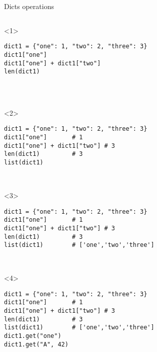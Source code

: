 \begin{frame}[fragile]{Dicts operations}

  \begin{columns}[onlytextwidth]
    \begin{column}{\textwidth}

      \begin{onlyenv}<1>
        \begin{lstlisting}[style=python,morekeywords={for, in, range, list}]
dict1 = {"one": 1, "two": 2, "three": 3}
dict1["one"]
dict1["one"] + dict1["two"]
len(dict1)




 \end{lstlisting}
      \end{onlyenv}

      \begin{onlyenv}<2>
        \begin{lstlisting}[style=python,morekeywords={for, in, range, list}]
dict1 = {"one": 1, "two": 2, "three": 3}
dict1["one"]       # 1
dict1["one"] + dict1["two"] # 3
len(dict1)         # 3
list(dict1)



 \end{lstlisting}
      \end{onlyenv}

      \begin{onlyenv}<3>
        \begin{lstlisting}[style=python,morekeywords={for, in, range, list}]
dict1 = {"one": 1, "two": 2, "three": 3}
dict1["one"]       # 1
dict1["one"] + dict1["two"] # 3
len(dict1)         # 3
list(dict1)        # ['one','two','three']



 \end{lstlisting}
      \end{onlyenv}

      \begin{onlyenv}<4>
        \begin{lstlisting}[style=python,morekeywords={for, in, range, list}]
dict1 = {"one": 1, "two": 2, "three": 3}
dict1["one"]       # 1
dict1["one"] + dict1["two"] # 3
len(dict1)         # 3
list(dict1)        # ['one','two','three']
dict1.get("one")
dict1.get("A", 42)

 \end{lstlisting}
      \end{onlyenv}


\end{column}
\end{columns}
\end{frame}
